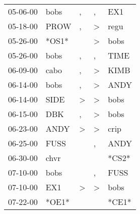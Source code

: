 \begin{supertabular}{p{0.07\textwidth}p{0.06\textwidth}p{0.02\textwidth}p{0.02\textwidth}p{0.06\textwidth}}
          05-06-00\textsuperscript{} &           bobs\textsuperscript{} &                , &                , &            EX1\textsuperscript{} \\
          05-18-00\textsuperscript{} &           PROW\textsuperscript{} &                , &     \textgreater &           regu\textsuperscript{} \\
          05-26-00\textsuperscript{} &                            *OS1* &                  &     \textgreater &           bobs\textsuperscript{} \\
          05-26-00\textsuperscript{} &           bobs\textsuperscript{} &                , &                , &           TIME\textsuperscript{} \\
          06-09-00\textsuperscript{} &           cabo\textsuperscript{} &                , &     \textgreater &           KIMB\textsuperscript{} \\
          06-14-00\textsuperscript{} &           bobs\textsuperscript{} &                , &     \textgreater &           ANDY\textsuperscript{} \\
          06-14-00\textsuperscript{} &           SIDE\textsuperscript{} &     \textgreater &     \textgreater &           bobs\textsuperscript{} \\
          06-15-00\textsuperscript{} &            DBK\textsuperscript{} &                , &     \textgreater &           bobs\textsuperscript{} \\
          06-23-00\textsuperscript{} &           ANDY\textsuperscript{} &     \textgreater &     \textgreater &           crip\textsuperscript{} \\
          06-25-00\textsuperscript{} &           FUSS\textsuperscript{} &                  &                , &           ANDY\textsuperscript{} \\
          06-30-00\textsuperscript{} &           chvr\textsuperscript{} &                  &                  &                            *CS2* \\
          07-10-00\textsuperscript{} &           bobs\textsuperscript{} &                  &                , &           FUSS\textsuperscript{} \\
          07-10-00\textsuperscript{} &            EX1\textsuperscript{} &     \textgreater &     \textgreater &           bobs\textsuperscript{} \\
          07-22-00\textsuperscript{} &                            *OE1* &                  &                  &                            *CE1* \\

\end{supertabular}
